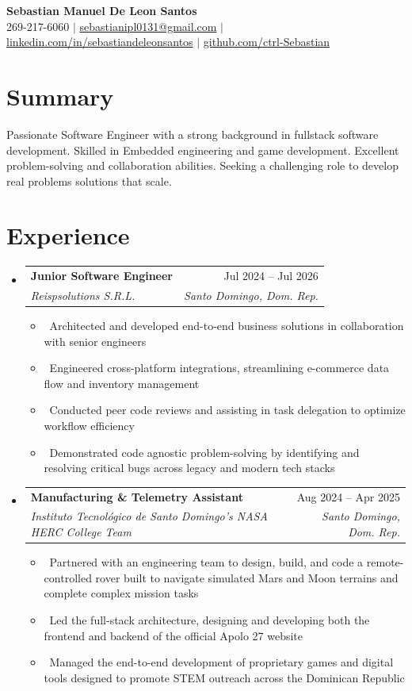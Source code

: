 \documentclass[letterpaper,10pt]{article}
\makeatletter
\newcommand{\resumeItem}[1]{\item\small{#1}}
\newcommand{\resumeSubheading}[4]{
	\vspace{-1pt}\item
	\begin{tabular*}{0.97\textwidth}[t]{l@{\extracolsep{\fill}}r}
		\textbf{#1} & #2 \\
		\textit{#3} & \textit{#4} \\
	\end{tabular*}\vspace{-7pt}
}
\newcommand{\resumeSubHeadingList}{\begin{itemize}[leftmargin=0.15in, label={}]}
\newcommand{\resumeSubHeadingListEnd}{\end{itemize}}
\makeatother
\begin{document}
	
	\begin{center}
		\textbf{\Huge Sebastian Manuel De Leon Santos} \\
		\small 269-217-6060 $|$ \href{mailto:sebastianipl0131@gmail.com}{sebastianipl0131@gmail.com} $|$ 
		\href{https://www.linkedin.com/in/sebastiandeleonsantos/}{linkedin.com/in/sebastiandeleonsantos} $|$
		\href{https://github.com/ctrl-Sebastian}{github.com/ctrl-Sebastian}
	\end{center}
	
	\section*{Summary}
	Passionate Software Engineer with a strong background in fullstack software development. Skilled in Embedded engineering and game development. Excellent problem-solving and collaboration abilities. Seeking a challenging role to develop real problems solutions that scale.
	
	\section{Experience}
	\resumeSubHeadingList
	\resumeSubheading
	{Junior Software Engineer}{Jul 2024 -- Jul 2026}
	{Reispsolutions S.R.L.}{Santo Domingo, Dom. Rep.}
	\resumeSubHeadingList
	\resumeItem{\textbullet\ Architected and developed end-to-end business solutions in collaboration with senior engineers}
	\resumeItem{\textbullet\ Engineered cross-platform integrations, streamlining e-commerce data flow and inventory management}
	\resumeItem{\textbullet\ Conducted peer code reviews and assisting in task delegation to optimize workflow efficiency}
	\resumeItem{\textbullet\ Demonstrated code agnostic problem-solving by identifying and resolving critical bugs across legacy and modern tech stacks}
	\resumeSubHeadingListEnd
	\resumeSubheading
	{Manufacturing \& Telemetry Assistant}{Aug 2024 -- Apr 2025}
	{Instituto Tecnológico de Santo Domingo's NASA HERC College Team}{Santo Domingo, Dom. Rep.}
	\resumeSubHeadingList
	\resumeItem{\textbullet\ Partnered with an engineering team to design, build, and code a remote-controlled rover built to navigate simulated Mars and Moon terrains and complete complex mission tasks}
	\resumeItem{\textbullet\ Led the full-stack architecture, designing and developing both the frontend and backend of the official Apolo 27 website}
	\resumeItem{\textbullet\ Managed the end-to-end development of proprietary games and digital tools designed to promote STEM outreach across the Dominican Republic}
	\resumeSubHeadingListEnd
	\resumeSubHeadingListEnd
	
\end{document}
